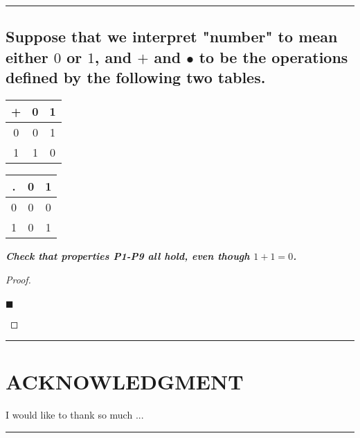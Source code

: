 \documentclass[letterpaper, 10 pt, conference]{ieeeconf}  %
\begin{document}
\noindent\rule{8cm}{0.4pt}
\begin{mdframed}
\subsection{\textbf{Suppose that we interpret "number" to mean either $0$ or $1$, and $+$ and $•$ to be the operations defined by the following two tables.}}

\begin{center}
    \begin{tabular}{c|c|c|} 
      + & 0 & 1 \\ 
      \hline
      0 & 0 & 1 \\ 
      \hline
      1 & 1 & 0 \\ 
      \hline
    \end{tabular}
    \tab \tab \tab
    \begin{tabular}{c|c|c|} 
      . & 0 & 1 \\ 
      \hline
      0 & 0 & 0 \\ 
      \hline
      1 & 0 & 1 \\ 
      \hline
    \end{tabular}
\end{center}

\textbf{\textit{Check that properties P1-P9 all hold, even though $1 + 1 = 0$.}}
\end{mdframed}

\begin{proof}
\begin{align}
    
\end{align}
\begin{flushright}
$\blacksquare$
\end{flushright}
\end{proof}
\noindent\rule{8cm}{0.4pt}

\newpage

\section*{ACKNOWLEDGMENT}
I would like to thank so much ...

\noindent\rule{8cm}{0.4pt}
\end{document}
